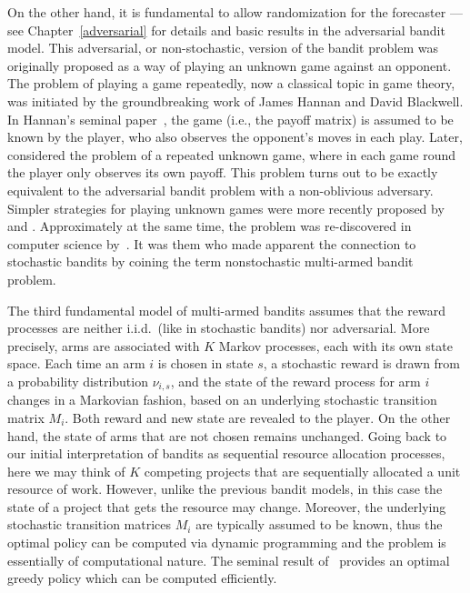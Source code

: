 On the other hand, it is fundamental to allow randomization for the forecaster ---see Chapter~\ref{adversarial} for details and basic results in the adversarial bandit model.
This adversarial, or non-stochastic, version of the bandit problem was originally proposed as a way of playing an unknown game against an opponent. The problem of playing a game repeatedly, now a classical topic in game theory, was initiated by the groundbreaking work of James Hannan and David Blackwell. In Hannan's seminal paper~\cite{Han57}, the game (i.e., the payoff matrix) is assumed to be known by the player, who also observes the opponent's moves in each play. Later, \cite{Ban68} considered the problem of a repeated unknown game, where in each game round the player only observes its own payoff. This problem turns out to be exactly equivalent to the adversarial bandit problem with a non-oblivious adversary. Simpler strategies for playing unknown games were more recently proposed by \cite{FoVo98} and \cite{HaMa99,HaMa00}. Approximately at the same time, the problem was re-discovered in computer science by~\cite{ACFS03}. It was them who made apparent the connection to stochastic bandits by coining the term nonstochastic multi-armed bandit problem. 

The third fundamental model of multi-armed bandits assumes that the reward processes are neither i.i.d.\ (like in stochastic bandits) nor adversarial. More precisely, arms are associated with $K$ Markov processes, each with its own state space. Each time an arm $i$ is chosen in state $s$, a stochastic reward is drawn from a probability distribution $\nu_{i,s}$, and the state of the reward process for arm $i$ changes in a Markovian fashion, based on an underlying stochastic transition matrix $M_i$. Both reward and new state are revealed to the player. On the other hand, the state of arms that are not chosen remains unchanged. Going back to our initial interpretation of bandits as sequential resource allocation processes, here we may think of $K$ competing projects that are sequentially allocated a unit resource of work. However, unlike the previous bandit models, in this case the state of a project that gets the resource may change. Moreover, the underlying stochastic transition matrices $M_i$ are typically assumed to be known, thus the optimal policy can be computed via dynamic programming and the problem is essentially of computational nature. The seminal result of~\cite{gittins1979bandit} provides an optimal greedy policy which can be computed efficiently.


